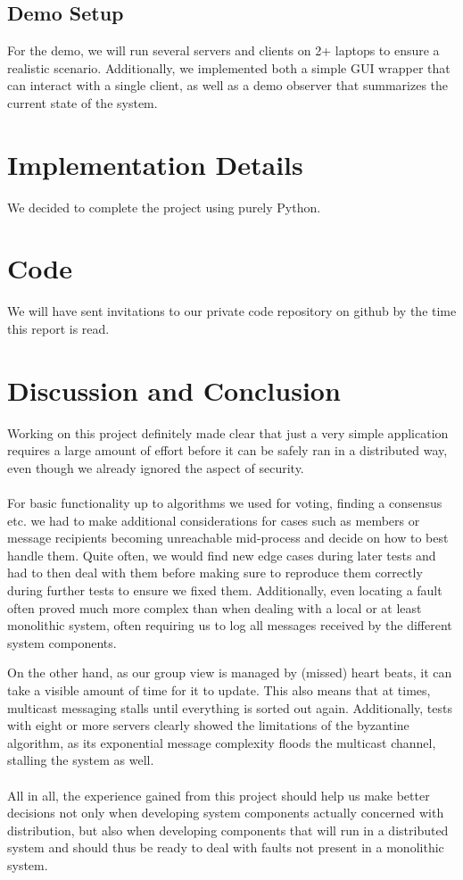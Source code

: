 \documentclass[runningheads]{llncs}
\begin{document}
\subsection{Demo Setup}
For the demo, we will run several servers and clients on 2+ laptops to ensure a realistic scenario.
Additionally, we implemented both a simple GUI wrapper that can interact with a single client, as well as a demo observer that summarizes the current state of the system.
\section{Implementation Details}
We decided to complete the project using purely Python.











\newpage
\section{Code}
We will have sent invitations to our private code repository on github by the time this report is read.

\section{Discussion and Conclusion}
Working on this project definitely made clear that just a very simple application requires a large amount of effort before it can be safely ran in a distributed way, even though we already ignored the aspect of security.
\\\\
For basic functionality up to algorithms we used for voting, finding a consensus etc. we had to make additional considerations for cases such as members or message recipients becoming unreachable mid-process and decide on how to best handle them.
Quite often, we would find new edge cases during later tests and had to then deal with them before making sure to reproduce them correctly during further tests to ensure we fixed them.
Additionally, even locating a fault often proved much more complex than when dealing with a local or at least monolithic system, often requiring us to log all messages received by the different system components.

On the other hand, as our group view is managed by (missed) heart beats, it can take a visible amount of time for it to update.
This also means that at times, multicast messaging stalls until everything is sorted out again.
Additionally, tests with eight or more servers clearly showed the limitations of the byzantine algorithm, as its exponential message complexity floods the multicast channel, stalling the system as well.
\\\\
All in all, the experience gained from this project should help us make better decisions not only when developing system components actually concerned with distribution, but also when developing components that will run in a distributed system and should thus be ready to deal with faults not present in a monolithic system.
\end{document}
